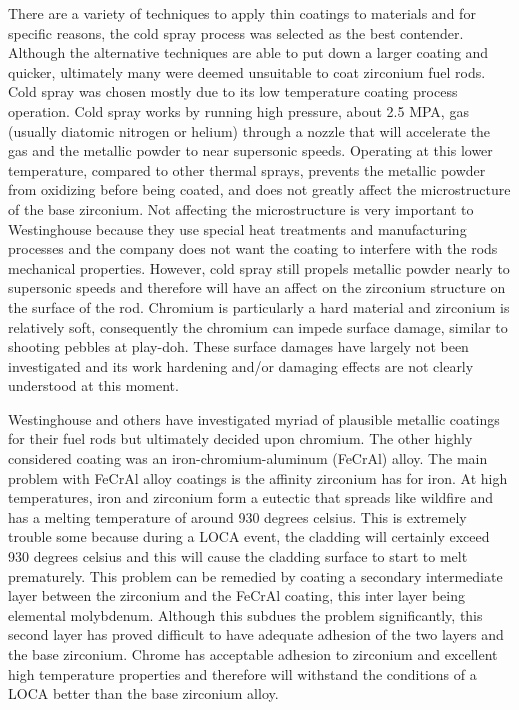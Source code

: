 \documentclass{article}
\begin{document}
There are a variety of techniques to apply thin coatings to materials and for specific reasons, the cold spray process was selected as the best contender.  Although the alternative techniques are able to put down a larger coating and quicker, ultimately many were deemed unsuitable to coat zirconium fuel rods.  Cold spray was chosen mostly due to its low temperature coating process operation.  Cold spray works by running high pressure, about 2.5 MPA, gas (usually diatomic nitrogen or helium) through a nozzle that will accelerate the gas and the metallic powder to near supersonic speeds.  Operating at this lower temperature, compared to other thermal sprays, prevents the metallic powder from oxidizing before being coated, and does not greatly affect the microstructure of the base zirconium.  Not affecting the microstructure is very important to Westinghouse because they use special heat treatments and manufacturing processes and the company does not want the coating to interfere with the rods mechanical properties.  However, cold spray still propels metallic powder nearly to supersonic speeds and therefore will have an affect on the zirconium structure on the surface of the rod.  Chromium is particularly a hard material and zirconium is relatively soft, consequently the chromium can impede surface damage, similar to shooting pebbles at play-doh. These surface damages have largely not been investigated and its work hardening and/or damaging effects are not clearly understood at this moment.  

Westinghouse and others have investigated myriad of plausible metallic coatings for their fuel rods but ultimately decided upon chromium.  The other highly considered coating was an iron-chromium-aluminum (FeCrAl) alloy.  The main problem with FeCrAl alloy coatings is the affinity zirconium has for iron.  At high temperatures, iron and zirconium form a eutectic that spreads like wildfire and has a melting temperature of around 930 degrees celsius.  This is extremely trouble some because during a LOCA event, the cladding will certainly exceed 930 degrees celsius and this will cause the cladding surface to start to melt prematurely.  This problem can be remedied by coating a secondary intermediate layer between the zirconium and the FeCrAl coating, this inter layer being elemental molybdenum.  Although this subdues the problem significantly, this second layer has proved difficult to have adequate adhesion of the two layers and the base zirconium.  Chrome has acceptable adhesion to zirconium and excellent high temperature properties and therefore will withstand the conditions of a LOCA better than the base zirconium alloy.
\end{document}

